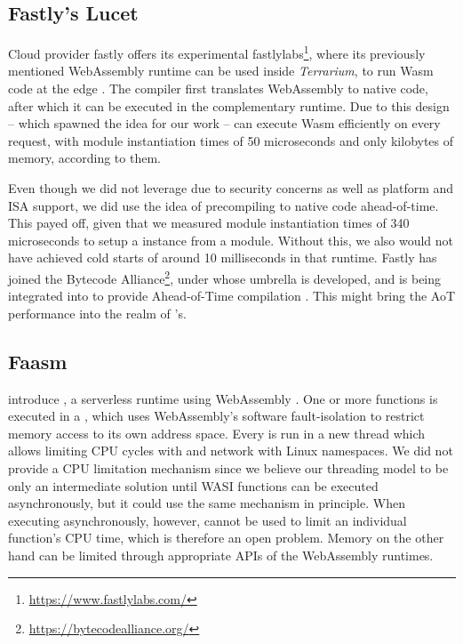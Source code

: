
\subsection{Fastly's Lucet}

Cloud provider fastly offers its experimental fastlylabs\footnote{\url{https://www.fastlylabs.com/}}, where its previously mentioned  WebAssembly runtime can be used inside \emph{Terrarium}, to run Wasm code at the edge \cite{fastly2019}. The  compiler first translates WebAssembly to native code, after which it can be executed in the complementary runtime. Due to this design -- which spawned the idea for our work --  can execute Wasm efficiently on every request, with module instantiation times of 50 microseconds and only kilobytes of memory, according to them.

Even though we did not leverage  due to security concerns as well as platform and ISA support, we did use the idea of precompiling to native code ahead-of-time. This payed off, given that we measured module instantiation times of 340 microseconds to setup a  instance from a module. Without this, we also would not have achieved cold starts of around 10 milliseconds in that runtime.
Fastly has joined the Bytecode Alliance\footnote{\url{https://bytecodealliance.org/}}, under whose umbrella  is developed, and  is being integrated into  to provide Ahead-of-Time compilation \cite{Hickey2020}. This might bring the AoT performance into the realm of 's.

\subsection{Faasm}

\citeauthor{Shillaker2020} introduce , a serverless runtime using WebAssembly \cite{Shillaker2020}. One or more functions is executed in a , which uses WebAssembly's software fault-isolation to restrict memory access to its own address space. Every  is run in a new thread which allows limiting CPU cycles with  and network with Linux namespaces.
We did not provide a CPU limitation mechanism since we believe our threading model to be only an intermediate solution until WASI functions can be executed asynchronously, but it could use the same  mechanism in principle. When executing asynchronously, however,  cannot be used to limit an individual function's CPU time, which is therefore an open problem. Memory on the other hand can be limited through appropriate APIs of the WebAssembly runtimes.

